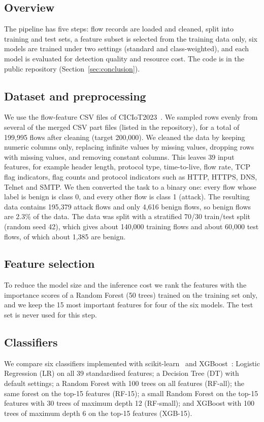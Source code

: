 \documentclass[runningheads]{llncs}
\begin{document}
\subsection{Overview}
The pipeline has five steps: flow records are loaded and cleaned, split into training and test sets, a feature subset is selected from the training data only, six models are trained under two settings (standard and class-weighted), and each model is evaluated for detection quality and resource cost. The code is in the public repository (Section~\ref{sec:conclusion}).


\subsection{Dataset and preprocessing}
We use the flow-feature CSV files of CICIoT2023~\cite{neto2023}. We sampled rows evenly from several of the merged CSV part files (listed in the repository), for a total of 199,995 flows after cleaning (target 200,000). We cleaned the data by keeping numeric columns only, replacing infinite values by missing values, dropping rows with missing values, and removing constant columns. This leaves 39 input features, for example header length, protocol type, time-to-live, flow rate, TCP flag indicators, flag counts and protocol indicators such as HTTP, HTTPS, DNS, Telnet and SMTP. We then converted the task to a binary one: every flow whose label is benign is class 0, and every other flow is class 1 (attack). The resulting data contains 195,379 attack flows and only 4,616 benign flows, so benign flows are 2.3\% of the data. The data was split with a stratified 70/30 train/test split (random seed 42), which gives about 140,000 training flows and about 60,000 test flows, of which about 1,385 are benign.

\subsection{Feature selection}
To reduce the model size and the inference cost we rank the features with the importance scores of a Random Forest (50 trees) trained on the training set only, and we keep the 15 most important features for four of the six models. The test set is never used for this step.

\subsection{Classifiers}
We compare six classifiers implemented with scikit-learn~\cite{pedregosa2011} and XGBoost~\cite{chen2016}: Logistic Regression (LR) on all 39 standardised features; a Decision Tree (DT) with default settings; a Random Forest with 100 trees on all features (RF-all); the same forest on the top-15 features (RF-15); a small Random Forest on the top-15 features with 30 trees of maximum depth 12 (RF-small); and XGBoost with 100 trees of maximum depth 6 on the top-15 features (XGB-15).
\end{document}
